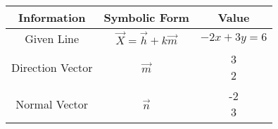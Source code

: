 \begin{tabular}[12pt]{|c|c|c|}
    \hline
	\textbf{Information} & \textbf{Symbolic Form} & \textbf{Value}\\ 
    \hline
	Given Line & $\vec{X} = \vec{h}+k\vec{m}$ & $-2x+3y=6$ \\
    \hline 
	Direction Vector & $\vec{m}$ & \myvec{3 \\ 2}\\
    \hline
	Normal Vector & $\vec{n}$ & \myvec{-2 \\ 3}\\
    \hline   
    \end{tabular}
